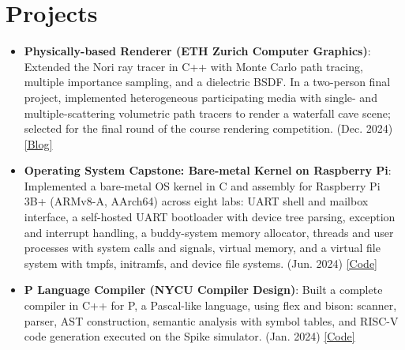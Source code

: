 \documentclass[a4paper,10pt]{extarticle}
\newcommand{\link}[2]{\href{#1}{\color{accent}[#2]}}
\newenvironment{cvlist}
  {\begin{itemize}[leftmargin=1em, itemsep=2pt, topsep=0pt, parsep=0pt, label=\textbullet]}
  {\end{itemize}}
\newcommand{\cvitem}[2]{\item \textbf{#1}: #2}
\begin{document}
\section{Projects}
\begin{cvlist}
\cvitem{Physically-based Renderer (ETH Zurich Computer Graphics)}{Extended the Nori ray tracer in C++ with Monte Carlo path tracing, multiple importance sampling, and a dielectric BSDF. In a two-person final project, implemented heterogeneous participating media with single- and multiple-scattering volumetric path tracers to render a waterfall cave scene; selected for the final round of the course rendering competition. (Dec. 2024) \link{https://blog.jayinnn.dev/posts/eth-cg24-final-project/}{Blog}}
\cvitem{Operating System Capstone: Bare-metal Kernel on Raspberry Pi}{Implemented a bare-metal OS kernel in C and assembly for Raspberry Pi 3B+ (ARMv8-A, AArch64) across eight labs: UART shell and mailbox interface, a self-hosted UART bootloader with device tree parsing, exception and interrupt handling, a buddy-system memory allocator, threads and user processes with system calls and signals, virtual memory, and a virtual file system with tmpfs, initramfs, and device file systems. (Jun. 2024) \link{https://github.com/jayin92/osc2024/tree/110550088}{Code}}
\cvitem{P Language Compiler (NYCU Compiler Design)}{Built a complete compiler in C++ for P, a Pascal-like language, using flex and bison: scanner, parser, AST construction, semantic analysis with symbol tables, and RISC-V code generation executed on the Spike simulator. (Jan. 2024) \link{https://github.com/jayin92/NYCU-intro-to-compiler}{Code}}


\end{cvlist}
\end{document}
